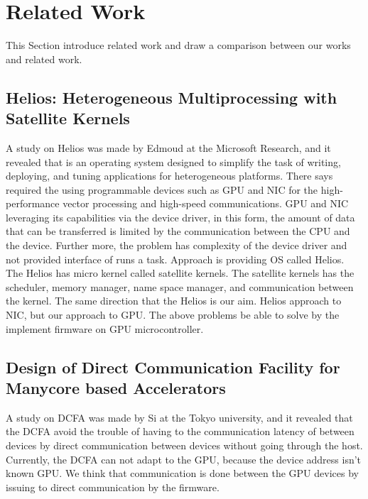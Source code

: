 
\section{Related Work}\label{sec:related}
This Section introduce related work and draw a comparison between our works and related work.
\subsection{Helios: Heterogeneous Multiprocessing with Satellite Kernels}
A study on Helios\cite{NightingaleEB:SOSP09:2009} was made by Edmoud at the Microsoft Research, and it revealed that is an operating system designed to simplify the task of writing, deploying, and tuning applications for heterogeneous platforms.
There says required the using programmable devices such as GPU and NIC for the high-performance vector processing and high-speed communications.
GPU and NIC leveraging its capabilities via the device driver, in this form, the amount of data that can be transferred is limited by the communication between the CPU and the device.
Further more, the problem has complexity of the device driver and not provided interface of runs a task.
Approach is providing OS called Helios.
The Helios has micro kernel called satellite kernels.
The satellite kernels has the scheduler, memory manager, name space manager, and communication between the kernel.
The same direction that the Helios is our aim.
Helios approach to NIC, but our approach to GPU.
The above problems be able to solve by the  implement firmware on GPU microcontroller.

\subsection{Design of Direct Communication Facility for Manycore based Accelerators}
A study on DCFA\cite{weko_81351_1} was made by Si at the Tokyo university, and it revealed that the DCFA avoid the trouble of having to the communication latency of between devices by direct communication between devices without going through the host.
Currently, the DCFA can not adapt to the GPU, because the device address isn't known GPU.
We think that communication is done between the GPU devices by issuing to direct communication by the firmware.


